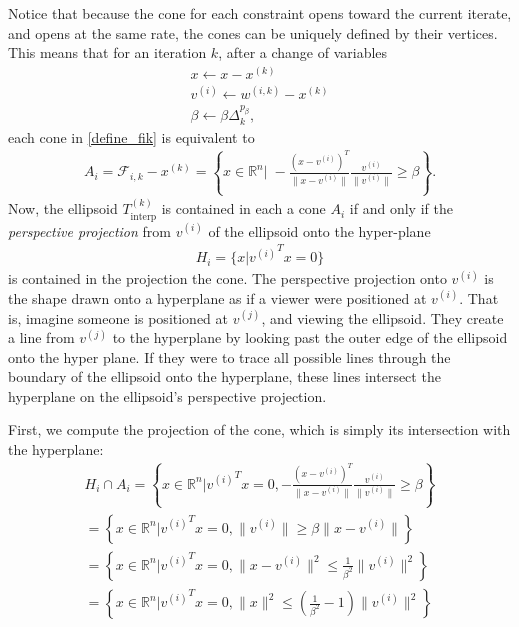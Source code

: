 \documentclass{article}
\theoremstyle{case}
\newcommand{\dk}{\Delta_k}
\newcommand{\fik}{{\mathcal F_{i, k}}}
\newcommand{\Rn}{\mathbb R^n}
\newcommand{\sampletrk}{{T_{\text{interp}}^{(k)}}}
\newcommand{\wik}{{w^{(i, k)}}}
\newcommand{\xk}{{x^{(k)}}}
\begin{document}
Notice that because the cone for each constraint opens toward the current iterate, and opens at the same rate, the cones can be uniquely defined by their vertices.
This means that for an iteration $k$, after a change of variables
\begin{align}
x \gets x - \xk \\
v^{(i)}  \gets \wik - \xk \\
\beta \gets \beta \dk^{p_{\beta}},
\end{align}
each cone in \cref{define_fik} is equivalent to
\begin{align*}
A_i = \fik - \xk = \left\{x\in\Rn\bigg|\;-\frac{(x - v^{(i)})^T}{\|x - v^{(i)}\|} \frac{v^{(i)}}{\|v^{(i)}\|} \ge \beta \right\}.
\end{align*}
Now, the ellipsoid $\sampletrk$ is contained in each a cone $A_i$ if and only if the \emph{perspective projection} from $v^{(i)}$ of the ellipsoid onto the hyper-plane 
\begin{align*}
H_i = \{x|{v^{(i)}}^Tx = 0\}
\end{align*}
is contained in the projection the cone.
The perspective projection onto $v^{(i)}$ is the shape drawn onto a hyperplane as if a viewer were positioned at $v^{(i)}$.
That is, imagine someone is positioned at $v^{(j)}$, and viewing the ellipsoid.
They create a line from $v^{(j)}$ to the hyperplane by looking past the outer edge of the ellipsoid onto the hyper plane.
If they were to trace all possible lines through the boundary of the ellipsoid onto the hyperplane, these lines intersect the hyperplane on the ellipsoid's perspective projection.

First, we compute the projection of the cone, which is simply its intersection with the hyperplane:
\begin{align*}
H_i \cap A_i 
= \left\{x \in \Rn \bigg| {v^{(i)}}^Tx = 0, -\frac{\left(x - v^{(i)}\right)^T}{\|x - v^{(i)}\|}\frac{v^{(i)}}{\|v^{(i)}\|}\ge \beta \right\} \\
= \left\{x \in \Rn \bigg| {v^{(i)}}^Tx = 0, \|v^{(i)}\|\ge \beta\|x - v^{(i)}\| \right\} \\
= \left\{x \in \Rn \bigg| {v^{(i)}}^Tx = 0, \|x - v^{(i)}\|^2 \le \frac 1 {\beta^2}\|v^{(i)}\|^2 \right\} \\
= \left\{x \in \Rn \bigg| {v^{(i)}}^Tx = 0, \|x\|^2 \le \left(\frac 1 {\beta^2} - 1\right)\|v^{(i)}\|^2 \right\} \\
\end{align*}
\end{document}
